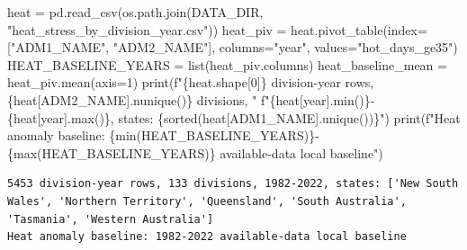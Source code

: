 \documentclass[
  letterpaper,
  DIV=11,
  numbers=noendperiod]{scrartcl}
\newenvironment{Shaded}{\begin{snugshade}}{\end{snugshade}}
\newcommand{\BuiltInTok}[1]{\textcolor[rgb]{0.00,0.23,0.31}{#1}}
\newcommand{\DecValTok}[1]{\textcolor[rgb]{0.68,0.00,0.00}{#1}}
\newcommand{\NormalTok}[1]{\textcolor[rgb]{0.00,0.23,0.31}{#1}}
\newcommand{\OperatorTok}[1]{\textcolor[rgb]{0.37,0.37,0.37}{#1}}
\newcommand{\SpecialCharTok}[1]{\textcolor[rgb]{0.37,0.37,0.37}{#1}}
\newcommand{\SpecialStringTok}[1]{\textcolor[rgb]{0.13,0.47,0.30}{#1}}
\newcommand{\StringTok}[1]{\textcolor[rgb]{0.13,0.47,0.30}{#1}}
\begin{document}
\begin{Shaded}
\begin{Highlighting}[]
\NormalTok{heat }\OperatorTok{=}\NormalTok{ pd.read\_csv(os.path.join(DATA\_DIR, }\StringTok{"heat\_stress\_by\_division\_year.csv"}\NormalTok{))}
\NormalTok{heat\_piv }\OperatorTok{=}\NormalTok{ heat.pivot\_table(index}\OperatorTok{=}\NormalTok{[}\StringTok{"ADM1\_NAME"}\NormalTok{, }\StringTok{"ADM2\_NAME"}\NormalTok{], columns}\OperatorTok{=}\StringTok{"year"}\NormalTok{, values}\OperatorTok{=}\StringTok{"hot\_days\_ge35"}\NormalTok{)}
\NormalTok{HEAT\_BASELINE\_YEARS }\OperatorTok{=} \BuiltInTok{list}\NormalTok{(heat\_piv.columns)}
\NormalTok{heat\_baseline\_mean }\OperatorTok{=}\NormalTok{ heat\_piv.mean(axis}\OperatorTok{=}\DecValTok{1}\NormalTok{)}
\BuiltInTok{print}\NormalTok{(}\SpecialStringTok{f"}\SpecialCharTok{\{}\NormalTok{heat}\SpecialCharTok{.}\NormalTok{shape[}\DecValTok{0}\NormalTok{]}\SpecialCharTok{\}}\SpecialStringTok{ division{-}year rows, }\SpecialCharTok{\{}\NormalTok{heat[}\StringTok{\textquotesingle{}ADM2\_NAME\textquotesingle{}}\NormalTok{]}\SpecialCharTok{.}\NormalTok{nunique()}\SpecialCharTok{\}}\SpecialStringTok{ divisions, "}
      \SpecialStringTok{f"}\SpecialCharTok{\{}\NormalTok{heat[}\StringTok{\textquotesingle{}year\textquotesingle{}}\NormalTok{]}\SpecialCharTok{.}\BuiltInTok{min}\NormalTok{()}\SpecialCharTok{\}}\SpecialStringTok{{-}}\SpecialCharTok{\{}\NormalTok{heat[}\StringTok{\textquotesingle{}year\textquotesingle{}}\NormalTok{]}\SpecialCharTok{.}\BuiltInTok{max}\NormalTok{()}\SpecialCharTok{\}}\SpecialStringTok{, states: }\SpecialCharTok{\{}\BuiltInTok{sorted}\NormalTok{(heat[}\StringTok{\textquotesingle{}ADM1\_NAME\textquotesingle{}}\NormalTok{].unique())}\SpecialCharTok{\}}\SpecialStringTok{"}\NormalTok{)}
\BuiltInTok{print}\NormalTok{(}\SpecialStringTok{f"Heat anomaly baseline: }\SpecialCharTok{\{}\BuiltInTok{min}\NormalTok{(HEAT\_BASELINE\_YEARS)}\SpecialCharTok{\}}\SpecialStringTok{{-}}\SpecialCharTok{\{}\BuiltInTok{max}\NormalTok{(HEAT\_BASELINE\_YEARS)}\SpecialCharTok{\}}\SpecialStringTok{ available{-}data local baseline"}\NormalTok{)}
\end{Highlighting}
\end{Shaded}

\begin{verbatim}
5453 division-year rows, 133 divisions, 1982-2022, states: ['New South Wales', 'Northern Territory', 'Queensland', 'South Australia', 'Tasmania', 'Western Australia']
Heat anomaly baseline: 1982-2022 available-data local baseline
\end{verbatim}
\end{document}
